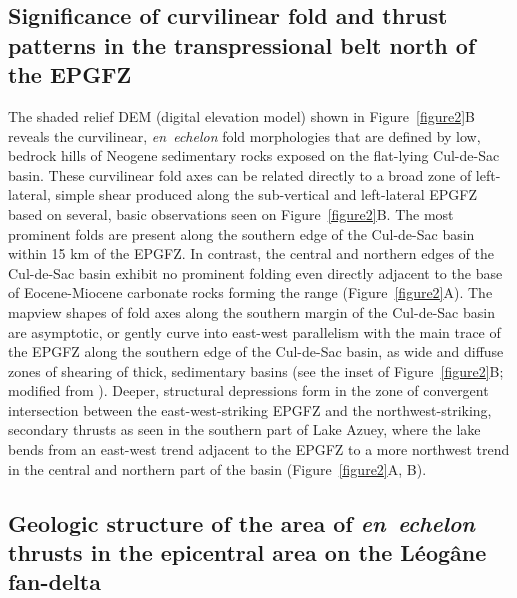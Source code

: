 \documentclass[linenumbers,draft]{agujournal}
\begin{document}
\subsection{Significance of curvilinear fold and thrust patterns in the transpressional belt north of the EPGFZ}
The shaded relief DEM (digital elevation model) shown in Figure~\ref{figure2}B reveals the curvilinear, \textit{en~echelon} fold morphologies that are defined by low, bedrock hills of Neogene sedimentary rocks exposed on the flat-lying Cul-de-Sac basin. These curvilinear fold axes can be related directly to a broad zone of left-lateral, simple shear produced along the sub-vertical and left-lateral EPGFZ based on several, basic observations seen on Figure~\ref{figure2}B. The most prominent folds are present along the southern edge of the Cul-de-Sac basin within 15 km of the EPGFZ. In contrast, the central and northern edges of the Cul-de-Sac basin exhibit no prominent folding even directly adjacent to the base of Eocene-Miocene carbonate rocks forming the range \citep{pubellier2000plate} (Figure~\ref{figure2}A). The mapview shapes of fold axes along the southern margin of the Cul-de-Sac basin are asymptotic, or gently curve into east-west parallelism with the main trace of the EPGFZ along the southern edge of the Cul-de-Sac basin, as wide and diffuse zones of shearing of thick, sedimentary basins (see the inset of Figure~{\ref{figure2}}B; modified from \citet{odonne1983analogue}). Deeper, structural depressions form in the zone of convergent intersection between the east-west-striking EPGFZ and the northwest-striking, secondary thrusts as seen in the southern part of Lake Azuey, where the lake bends from an east-west trend adjacent to the EPGFZ to a more northwest trend in the central and northern part of the basin (Figure~\ref{figure2}A, B).

\subsection{Geologic structure of the area of \textit{en~echelon} thrusts in the epicentral area on the L\'eog\^ane fan-delta}
\end{document}
